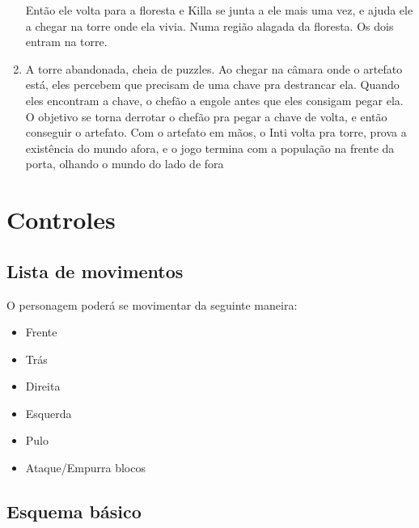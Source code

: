\documentclass[12pt]{article}
\begin{document}
\begin{enumerate}
Então ele volta para a floresta e Killa se junta a ele mais uma vez, e ajuda ele a chegar na torre onde ela vivia. Numa região alagada da floresta. Os dois entram na torre.
\item A torre abandonada, cheia de puzzles. Ao chegar na câmara onde o artefato está, eles percebem que precisam de uma chave pra destrancar ela. Quando eles encontram a chave, o chefão a engole antes que eles consigam pegar ela. O objetivo se torna derrotar o chefão pra pegar a chave de volta, e então conseguir o artefato.
Com o artefato em mãos, o Inti volta pra torre, prova a existência do mundo afora, e o jogo termina com a população na frente da porta, olhando o mundo do lado de fora
\end{enumerate}
\section{Controles}

\subsection{Lista de movimentos}
O personagem poderá se movimentar da seguinte maneira:

\begin{itemize}
    \item Frente
    \item Trás
    \item Direita
    \item Esquerda
    \item Pulo
    \item Ataque/Empurra blocos
\end{itemize}

\subsection{Esquema básico}
\end{document}

